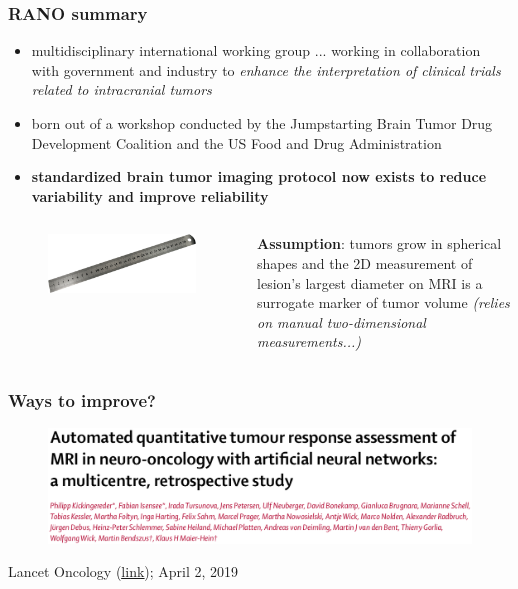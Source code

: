 \documentclass{beamer}
\begin{document}
\begin{frame}
\frametitle{RANO summary}
\begin{itemize}
	\item multidisciplinary international working group ... working in collaboration with government and industry to \textit{enhance the interpretation of clinical trials related to intracranial tumors}
	\item born out of a workshop conducted by the Jumpstarting Brain Tumor Drug Development Coalition and the US Food and Drug Administration
	\item \textbf{standardized brain tumor imaging protocol now exists to reduce variability and improve reliability}
\end{itemize}

\begin{columns}
	\begin{column}{0.5\textwidth}
\begin{figure}
	\centering
	\includegraphics[width=0.5\textheight]{images/ruler.jpg}
\end{figure}
	\end{column}
	\begin{column}{0.5\textwidth}
		\textbf{Assumption}: tumors grow in spherical shapes and the 2D measurement of lesion's largest diameter on MRI is a surrogate marker of tumor volume \textit{{\color{gray}(relies on manual two-dimensional measurements...)}}
	\end{column}
\end{columns}
\end{frame}


\begin{frame}
\frametitle{Ways to improve?}
\begin{figure}
	\centering
	\includegraphics[width=1.0\textwidth]{images/paper_01_name.png}
	\label{fig:full_process}
\end{figure}
Lancet Oncology (\href{https://www.thelancet.com/journals/lanonc/article/PIIS1470-2045(19)30098-1/fulltext}{{\color{blue}\underline{link}}}); April 2, 2019

\end{frame}
\end{document}

